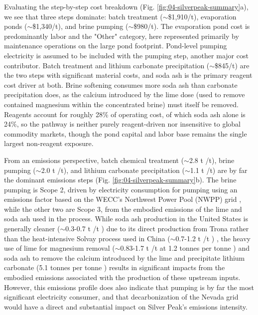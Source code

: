\documentclass{article}
\renewcommand\_{\textunderscore\allowbreak}
\begin{document}
Evaluating the step-by-step cost breakdown (Fig. \ref{fig:04-silverpeak-summary}a), we see that three steps dominate: batch treatment ($\sim$\$1,910/t), evaporation ponds ($\sim$\$1,340/t), and brine pumping ($\sim$\$980/t). The evaporation pond cost is predominantly labor and the "Other" category, here represented primarily by maintenance operations on the large pond footprint. Pond-level pumping electricity is assumed to be included with the pumping step, another major cost contributor. Batch treatment and lithium carbonate precipitation ($\sim$\$845/t) are the two steps with significant material costs, and soda ash is the primary reagent cost driver at both. Brine softening consumes more soda ash than carbonate precipitation does, as the calcium introduced by the lime dose (used to remove contained magnesium within the concentrated brine) must itself be removed. Reagents account for roughly 28\% of operating cost, of which soda ash alone is 24\%, so the pathway is neither purely reagent-driven nor insensitive to global commodity markets, though the pond capital and labor base remains the single largest non-reagent exposure.

From an emissions perspective, batch chemical treatment ($\sim$2.8 t /t), brine pumping ($\sim$2.0 t /t), and lithium carbonate precipitation ($\sim$1.1 t /t) are by far the dominant emissions steps (Fig. \ref{fig:04-silverpeak-summary}b). The brine pumping is Scope 2, driven by electricity consumption for pumping using an emissions factor based on the WECC's Northwest Power Pool (NWPP) grid \cite{usepaSummaryData2025}, while the other two are Scope 3, from the embodied emissions of the lime and soda ash used in the process. While soda ash production in the United States is generally cleaner ($\sim$0.3-0.7 t /t ) due to its direct production from Trona rather than the heat-intensive Solvay process used in China ($\sim$0.7-1.2 t /t ) \cite{wangGreenhouseGasesRegulated2024, scottCanSyntheticSoda2023, royLithiumClayAssessing2024}, the heavy use of lime for magnesium removal ($\sim$0.83-1.7 t /t  at 1.2 tonnes  per tonne ) and soda ash to remove the calcium introduced by the lime and precipitate lithium carbonate (5.1 tonnes  per tonne ) results in significant impacts from the embodied emissions associated with the production of these upstream inputs. However, this emissions profile does also indicate that pumping is by far the most significant electricity consumer, and that decarbonization of the Nevada grid would have a direct and substantial impact on Silver Peak's emissions intensity.
\end{document}
